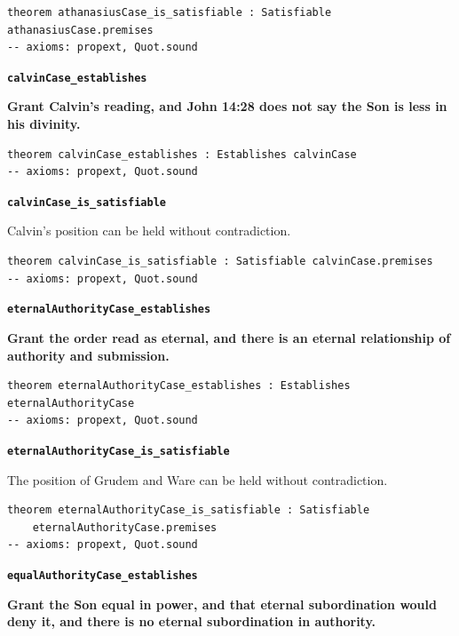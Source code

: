 \documentclass[11pt,paper=\testimonypaper,DIV=13,parskip=false]{scrartcl}
\begin{document}
{\small\begin{verbatim}
theorem athanasiusCase_is_satisfiable : Satisfiable athanasiusCase.premises
-- axioms: propext, Quot.sound
\end{verbatim}}
\par\medskip\noindent\textbf{\texttt{calvin\allowbreak{}Case\_\allowbreak{}establishes}}\par\nobreak\noindent
\textbf{Grant Calvin’s reading, and John 14:28 does not say the Son is less in his divinity.}

{\small\begin{verbatim}
theorem calvinCase_establishes : Establishes calvinCase
-- axioms: propext, Quot.sound
\end{verbatim}}
\par\medskip\noindent\textbf{\texttt{calvin\allowbreak{}Case\_\allowbreak{}is\_\allowbreak{}satisfiable}}\par\nobreak\noindent
Calvin’s position can be held without contradiction.

{\small\begin{verbatim}
theorem calvinCase_is_satisfiable : Satisfiable calvinCase.premises
-- axioms: propext, Quot.sound
\end{verbatim}}
\par\medskip\noindent\textbf{\texttt{eternal\allowbreak{}Authority\allowbreak{}Case\_\allowbreak{}establishes}}\par\nobreak\noindent
\textbf{Grant the order read as eternal, and there is an eternal relationship of authority and submission.}

{\small\begin{verbatim}
theorem eternalAuthorityCase_establishes : Establishes eternalAuthorityCase
-- axioms: propext, Quot.sound
\end{verbatim}}
\par\medskip\noindent\textbf{\texttt{eternal\allowbreak{}Authority\allowbreak{}Case\_\allowbreak{}is\_\allowbreak{}satisfiable}}\par\nobreak\noindent
The position of Grudem and Ware can be held without contradiction.

{\small\begin{verbatim}
theorem eternalAuthorityCase_is_satisfiable : Satisfiable
    eternalAuthorityCase.premises
-- axioms: propext, Quot.sound
\end{verbatim}}
\par\medskip\noindent\textbf{\texttt{equal\allowbreak{}Authority\allowbreak{}Case\_\allowbreak{}establishes}}\par\nobreak\noindent
\textbf{Grant the Son equal in power, and that eternal subordination would deny it, and there is no eternal subordination in authority.}
\end{document}
